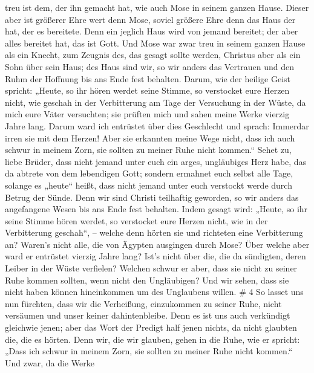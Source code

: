 treu ist dem, der ihn gemacht hat, wie auch Mose in seinem ganzen Hause.
 Dieser aber ist größerer Ehre wert denn Mose, soviel
größere Ehre denn das Haus der hat, der es bereitete.  Denn
ein jeglich Haus wird von jemand bereitet; der aber alles bereitet hat,
das ist Gott.  Und Mose war zwar treu in seinem ganzen Hause
als ein Knecht, zum Zeugnis des, das gesagt sollte werden, 
Christus aber als ein Sohn über sein Haus; des Haus sind wir, so wir
anders das Vertrauen und den Ruhm der Hoffnung bis ans Ende fest
behalten.  Darum, wie der heilige Geist spricht: „Heute, so
ihr hören werdet seine Stimme,  so verstocket eure Herzen
nicht, wie geschah in der Verbitterung am Tage der Versuchung in der
Wüste,  da mich eure Väter versuchten; sie prüften mich und
sahen meine Werke vierzig Jahre lang.  Darum ward ich
entrüstet über dies Geschlecht und sprach: Immerdar irren sie mit dem
Herzen! Aber sie erkannten meine Wege nicht,  dass ich auch
schwur in meinem Zorn, sie sollten zu meiner Ruhe nicht kommen.``
 Sehet zu, liebe Brüder, dass nicht jemand unter euch ein
arges, ungläubiges Herz habe, das da abtrete von dem lebendigen Gott;
 sondern ermahnet euch selbst alle Tage, solange es
„heute`` heißt, dass nicht jemand unter euch verstockt werde durch
Betrug der Sünde.  Denn wir sind Christi teilhaftig
geworden, so wir anders das angefangene Wesen bis ans Ende fest
behalten.  Indem gesagt wird: „Heute, so ihr seine Stimme
hören werdet, so verstocket eure Herzen nicht, wie in der Verbitterung
geschah``, --  welche denn hörten sie und richteten eine
Verbitterung an? Waren's nicht alle, die von Ägypten ausgingen durch
Mose?  Über welche aber ward er entrüstet vierzig Jahre
lang? Ist's nicht über die, die da sündigten, deren Leiber in der Wüste
verfielen?  Welchen schwur er aber, dass sie nicht zu
seiner Ruhe kommen sollten, wenn nicht den Ungläubigen? 
Und wir sehen, dass sie nicht haben können hineinkommen um des
Unglaubens willen. \# 4  So lasset uns nun fürchten, dass
wir die Verheißung, einzukommen zu seiner Ruhe, nicht versäumen und
unser keiner dahintenbleibe.  Denn es ist uns auch
verkündigt gleichwie jenen; aber das Wort der Predigt half jenen nichts,
da nicht glaubten die, die es hörten.  Denn wir, die wir
glauben, gehen in die Ruhe, wie er spricht: „Dass ich schwur in meinem
Zorn, sie sollten zu meiner Ruhe nicht kommen.`` Und zwar, da die Werke
